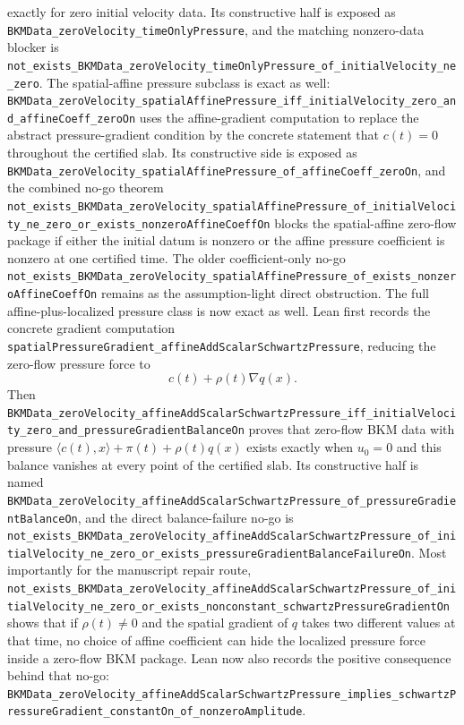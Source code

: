 \documentclass[11pt]{article}
\begin{document}
exactly for zero initial velocity data.  Its constructive half is exposed as
\texttt{BKMData\_zeroVelocity\_timeOnlyPressure}, and the matching nonzero-data
blocker is
\texttt{not\_exists\_BKMData\_zeroVelocity\_timeOnlyPressure\_of\_initialVelocity\_ne\_zero}.
The spatial-affine pressure subclass is exact as well:
\texttt{BKMData\_zeroVelocity\_spatialAffinePressure\_iff\_initialVelocity\_zero\_and\_affineCoeff\_zeroOn}
uses the affine-gradient computation to replace the abstract pressure-gradient
condition by the concrete statement that \(c(t)=0\) throughout the certified
slab.  Its constructive side is exposed as
\texttt{BKMData\_zeroVelocity\_spatialAffinePressure\_of\_affineCoeff\_zeroOn},
and the combined no-go theorem
\texttt{not\_exists\_BKMData\_zeroVelocity\_spatialAffinePressure\_of\_initialVelocity\_ne\_zero\_or\_exists\_nonzeroAffineCoeffOn}
blocks the spatial-affine zero-flow package if either the initial datum is
nonzero or the affine pressure coefficient is nonzero at one certified time.
The older coefficient-only no-go
\texttt{not\_exists\_BKMData\_zeroVelocity\_spatialAffinePressure\_of\_exists\_nonzeroAffineCoeffOn}
remains as the assumption-light direct obstruction.
The full affine-plus-localized pressure class is now exact as well.  Lean first
records the concrete gradient computation
\texttt{spatialPressureGradient\_affineAddScalarSchwartzPressure}, reducing the
zero-flow pressure force to
\[
  c(t)+\rho(t)\nabla q(x).
\]
Then
\texttt{BKMData\_zeroVelocity\_affineAddScalarSchwartzPressure\_iff\_initialVelocity\_zero\_and\_pressureGradientBalanceOn}
proves that zero-flow BKM data with pressure
\(\langle c(t),x\rangle+\pi(t)+\rho(t)q(x)\) exists exactly when \(u_0=0\)
and this balance vanishes at every point of the certified slab.  Its
constructive half is named
\texttt{BKMData\_zeroVelocity\_affineAddScalarSchwartzPressure\_of\_pressureGradientBalanceOn},
and the direct balance-failure no-go is
\texttt{not\_exists\_BKMData\_zeroVelocity\_affineAddScalarSchwartzPressure\_of\_initialVelocity\_ne\_zero\_or\_exists\_pressureGradientBalanceFailureOn}.
Most importantly for the manuscript repair route,
\texttt{not\_exists\_BKMData\_zeroVelocity\_affineAddScalarSchwartzPressure\_of\_initialVelocity\_ne\_zero\_or\_exists\_nonconstant\_schwartzPressureGradientOn}
shows that if \(\rho(t)\neq 0\) and the spatial gradient of \(q\) takes two
different values at that time, no choice of affine coefficient can hide the
localized pressure force inside a zero-flow BKM package.
Lean now also records the positive consequence behind that no-go:
\texttt{BKMData\_zeroVelocity\_affineAddScalarSchwartzPressure\_implies\_schwartzPressureGradient\_constantOn\_of\_nonzeroAmplitude}.
\end{document}
